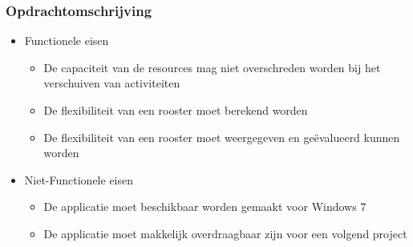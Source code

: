 \begin{frame}\frametitle{Opdrachtomschrijving}
	\begin{itemize}
		\item Functionele eisen
		\begin{itemize}
			\item De capaciteit van de resources mag niet overschreden worden bij het verschuiven van activiteiten
			\item De flexibiliteit van een rooster moet berekend worden
			\item De flexibiliteit van een rooster moet weergegeven en ge\"evalueerd kunnen worden
		\end{itemize}
		\item Niet-Functionele eisen
		\begin{itemize}
			\item De applicatie moet beschikbaar worden gemaakt voor Windows 7
			\item De applicatie moet makkelijk overdraagbaar zijn voor een volgend project
		\end{itemize}
	\end{itemize}
\end{frame}